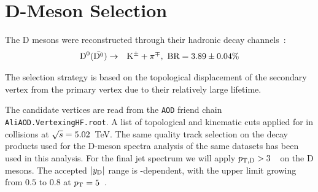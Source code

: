\section{D-Meson Selection}
\label{sec:DmesonSel}

The D mesons were reconstructed through their hadronic decay channels~\cite{PDG:2018}:
\begin{eqnarray*}
\mathrm{D^{0}} (\bar{\mathrm{D^{0}}}) &\to& {\rm K}^{\pm} + \pi^{\mp}  , {\text{ BR}} = 3.89\pm {0.04} \%\\
\end{eqnarray*}

The selection strategy is based on the topological displacement of the secondary vertex from the primary vertex due to their relatively large lifetime.

The candidate vertices are read from the \texttt{AOD} friend chain \texttt{AliAOD.VertexingHF.root}. A list of topological and kinematic cuts applied for \Dzero in \pp collisions at $\sqrt{s}=5.02$~TeV.
The same quality track selection on the decay products used for the D-meson spectra analysis of the same datasets has been used in this analysis.
For the final jet spectrum we will apply $p_{\mathrm{T,D}}> 3$~\GeVc\ on the D mesons. The accepted $|y_{\rm D}|$ range is \pt-dependent, with the upper limit growing from $0.5$ to $0.8$ at $p_{\rm T}=5$~\GeVc.

    
    
